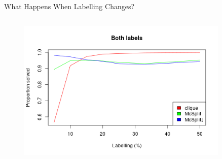 \documentclass{beamer}
\begin{document}
\begin{frame}{What Happens When Labelling Changes?}
\begin{columns}
\begin{column}{0.5\textwidth}
\begin{figure}
        \includegraphics[width=0.9\textwidth]{../dissertation/images/both_labels_linechart.png}
      \end{figure}
    \end{column}
  \end{columns}
\end{frame}

\end{document}
